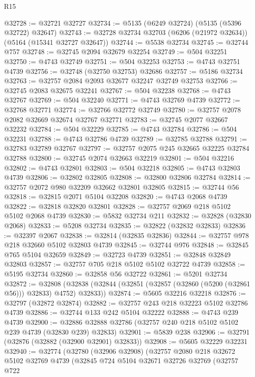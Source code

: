 \begin{lexlean}{R15}
\begin{coremodule}
{{{{{{{{{{{@32728 := @32721 @32727
@32734 := @5135 (@6249 @32724) (@5135 (@5396 @32722) @32647)
@32743 := @32728 @32734 @32703 (@6206 (@21972 @32634)) (@5164 (@15341 @32727 @32647))
@32744 := @5538 @32734
@32745 := @32744 @757
@32748 := @32745 @2094 @32679 @32254
@32749 := @504 @32251
@32750 := @4743 @32749
@32751 := @504 @32253
@32753 := @4743 @32751 @4739
@32756 := @32748 (@32750 @32753) @32686
@32757 := @5186 @32734
@32763 := @32757 @2084 @2093 @32677 @32247 @32749 @32753
@32766 := @32745 @2083 @32675 @32241
@32767 := @504 @32238
@32768 := @4743 @32767
@32769 := @504 @32240
@32771 := @4743 @32769 @4739
@32772 := @32768 @32771
@32774 := @32766 @32772 @32749
@32780 := @32757 @2078 @2082 @32669 @32674 @32767 @32771
@32783 := @32745 @2077 @32667 @32232
@32784 := @504 @32229
@32785 := @4743 @32784
@32786 := @504 @32231
@32788 := @4743 @32786 @4739
@32789 := @32785 @32788
@32791 := @32783 @32789 @32767
@32797 := @32757 @2075 @245 @32665 @32225 @32784 @32788
@32800 := @32745 @2074 @32663 @32219
@32801 := @504 @32216
@32802 := @4743 @32801
@32803 := @504 @32218
@32805 := @4743 @32803 @4739
@32806 := @32802 @32805
@32808 := @32800 @32806 @32784
@32814 := @32757 @2072 @980 @32209 @32662 @32801 @32805
@32815 := @32744 @56
@32818 := @32815 @2071 @5104 @32208
@32820 := @4743 @2068 @4739
@32822 := @32818 @32820 @32801
@32828 := @32757 @2069 @218 @5102 @5102 @2068 @4739
@32830 := @5832 @32734 @211
@32832 := @32828 (@32830 @2068)
@32833 := @5208 @32734
@32835 := @32822 (@32832 @32833)
@32836 := @32397 @2067
@32838 := @32814 (@32835 @32836)
@32844 := @32757 @978 @218 @32660 @5102 @32803 @4739
@32845 := @32744 @976
@32848 := @32845 @765 @5104 @32659
@32849 := @32723 @4739
@32851 := @32848 @32849 @32803
@32857 := @32757 @705 @218 @5102 @5102 @32722 @4739
@32858 := @5195 @32734
@32860 := @32858 @56 @32722
@32861 := @5201 @32734
@32872 := @32808
    (@32838 (@32844 (@32851 (@32857 (@32860 (@5200 (@32861 @56))) @32833) @4752) @32833))
@32874 := @5605 @32216 @32218
@32876 := @32797 (@32872 @32874)
@32882 := @32757 @243 @218 @32223 @5102 @32786 @4739
@32886 := @32744 @133 @242 @5104 @32222
@32888 := @4743 @239 @4739
@32900 := @32886 @32888 @32786 (@32757 @240 @218 @5102 @5102 @239 @4739 (@32830 @239) @32833)
@32901 := @5839 @238
@32906 := @32791 (@32876 (@32882 (@32900 @32901) @32833))
@32908 := @5605 @32229 @32231
@32940 := @32774
    (@32780
      (@32906 @32908)
      (@32757
        @2080
        @218
        @32672
        @5102
        @32769
        @4739
        (@32845
          @724
          @5104
          @32671
          @32726
          @32769
          (@32757
            @722
}}}}}}}}}}}
\end{coremodule}
\end{lexlean}
